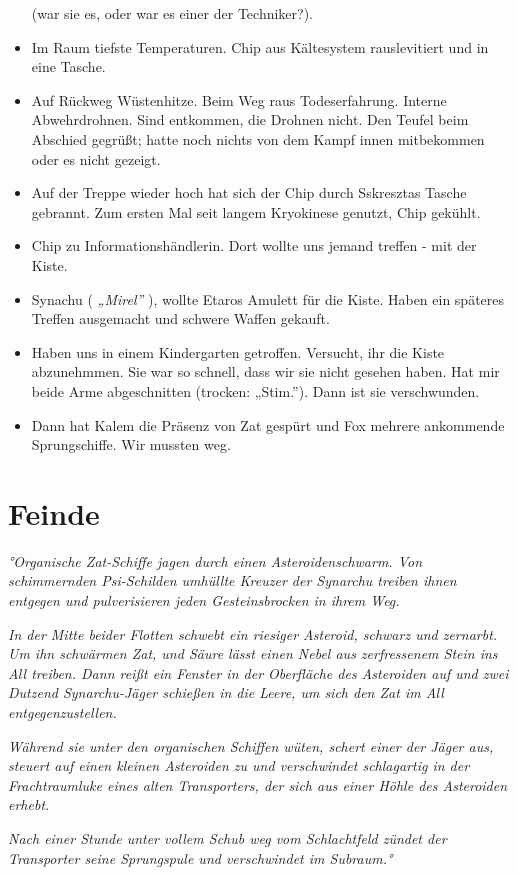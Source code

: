 \documentclass[11pt]{article}
\begin{document}
\begin{itemize}
  (war sie es, oder war es einer der Techniker?).
\item
  Im Raum tiefste Temperaturen. Chip aus Kältesystem rauslevitiert und
  in eine Tasche.
\item
  Auf Rückweg Wüstenhitze. Beim Weg raus Todeserfahrung. Interne
  Abwehrdrohnen. Sind entkommen, die Drohnen nicht. Den Teufel beim
  Abschied gegrüßt; hatte noch nichts von dem Kampf innen mitbekommen
  oder es nicht gezeigt.
\item
  Auf der Treppe wieder hoch hat sich der Chip durch Sskresztas Tasche
  gebrannt. Zum ersten Mal seit langem Kryokinese genutzt, Chip gekühlt.
\item
  Chip zu Informationshändlerin. Dort wollte uns jemand treffen - mit
  der Kiste.
\item
  Synachu ( \emph{„Mirel''} ), wollte Etaros Amulett für die Kiste.
  Haben ein späteres Treffen ausgemacht und schwere Waffen gekauft.
\item
  Haben uns in einem Kindergarten getroffen. Versucht, ihr die Kiste
  abzunehmmen. Sie war so schnell, dass wir sie nicht gesehen haben. Hat
  mir beide Arme abgeschnitten (trocken: „Stim.''). Dann ist sie
  verschwunden.
\item
  Dann hat Kalem die Präsenz von Zat gespürt und Fox mehrere ankommende
  Sprungschiffe. Wir mussten weg.
\end{itemize}
\section{Feinde}

\emph{°Organische Zat-Schiffe jagen durch einen Asteroidenschwarm. Von
schimmernden Psi-Schilden umhüllte Kreuzer der Synarchu treiben ihnen
entgegen und pulverisieren jeden Gesteinsbrocken in ihrem Weg.}

\emph{In der Mitte beider Flotten schwebt ein riesiger Asteroid, schwarz
und zernarbt. Um ihn schwärmen Zat, und Säure lässt einen Nebel aus
zerfressenem Stein ins All treiben. Dann reißt ein Fenster in der
Oberfläche des Asteroiden auf und zwei Dutzend Synarchu-Jäger schießen
in die Leere, um sich den Zat im All entgegenzustellen.}

\emph{Während sie unter den organischen Schiffen wüten, schert einer der
Jäger aus, steuert auf einen kleinen Asteroiden zu und verschwindet
schlagartig in der Frachtraumluke eines alten Transporters, der sich aus
einer Höhle des Asteroiden erhebt.}

\emph{Nach einer Stunde unter vollem Schub weg vom Schlachtfeld zündet
der Transporter seine Sprungspule und verschwindet im Subraum.°}
\end{document}
